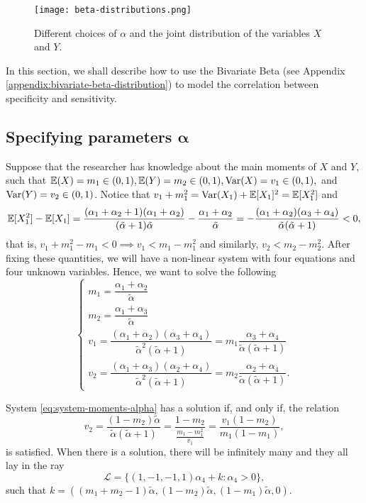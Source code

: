 \begin{figure}[!ht]
    \centering
    \texttt{[image: beta-distributions.png]}
    \caption{Different choices of $\alpha$ and the joint distribution of the variables $X$ and $Y$.}
    \label{fig:beta-bivariate}
\end{figure}

In this section, we shall describe how to use the Bivariate Beta (see Appendix
\ref{appendix:bivariate-beta-distribution}) to model the correlation between
specificity and sensitivity.

\subsection{Specifying parameters
\texorpdfstring{$\boldsymbol{\alpha}$}{alpha}}

Suppose that the researcher has knowledge about the main moments of $X$ and
$Y$, such that $\mathbb{E}(X) = m_1 \in (0,1), \mathbb{E}(Y) = m_2 \in (0,1), \operatorname{Var}(X) = v_1
\in (0, 1),$ and $\operatorname{Var}(Y) =
v_2 \in (0,1)$. Notice that $v_1 + m_1^2 = \operatorname{Var}(X_1) + \mathbb{E}[X_1]^2 = \mathbb{E}[X_1^2]$ and
$$
\mathbb{E}[X_1^2] - \mathbb{E}[X_1] = \frac{(\alpha_1 + \alpha_2 + 1)(\alpha_1 + \alpha_2)}{(\tilde{\alpha} + 1)\tilde{\alpha}} - \frac{\alpha_1 + \alpha_2}{\tilde{\alpha}} = -\frac{(\alpha_1 + \alpha_2)(\alpha_3 + \alpha_4)}{\tilde{\alpha}(\tilde{\alpha}+1)} < 0, 
$$
that is, $v_1 + m_1^2 - m_1 < 0 \implies v_1 < m_1 - m_1^2$ and similarly,
$v_2 < m_2 - m_2^2$. After fixing these quantities, we will have a non-linear system with four equations and four
unknown variables. Hence, we want to solve the following 
\begin{equation}
  \label{eq:system-moments-alpha}
  \begin{cases}
    m_1 = \dfrac{\alpha_1+\alpha_2}{\tilde{\alpha}} \\
    m_2 = \dfrac{\alpha_1+\alpha_3}{\tilde{\alpha}} \\ 
    v_1 = \dfrac{(\alpha_1+\alpha_2)(\alpha_3+\alpha_4)}{\tilde{\alpha}^2(\tilde{\alpha}+1)} = m_1\dfrac{\alpha_3+\alpha_4}{\tilde{\alpha}(\tilde{\alpha}+1)} \\
    v_2 = \dfrac{(\alpha_1+\alpha_3)(\alpha_2+\alpha_4)}{\tilde{\alpha}^2(\tilde{\alpha}+1)} = m_2\dfrac{\alpha_2+\alpha_4}{\tilde{\alpha}(\tilde{\alpha}+1)}.
  \end{cases}
\end{equation}

\begin{proposition}
  System \eqref{eq:system-moments-alpha} has a solution if, and only if, the relation
  \begin{equation}
    \label{eq:v2}
    v_2 = \frac{(1 - m_2)\tilde{\alpha}}{\tilde{\alpha}(\tilde{\alpha}+ 1)} = \frac{1 - m_2}{\frac{m_1 - m_1^2}{v_1}} = \frac{v_1(1 - m_2)}{m_1(1-m_1)},
  \end{equation}
  is satisfied. When there is a solution, there will be
  infinitely many and they all lay in the ray 
  $$
\mathcal{L} = \{(1,-1,-1,1)\alpha_4 + k : \alpha_4 > 0\}, 
$$
such that $k = \left((m_1 + m_2 - 1)\tilde{\alpha}, (1-m_2)\tilde{\alpha},
(1-m_1)\tilde{\alpha}, 0\right)$. 
\end{proposition}

